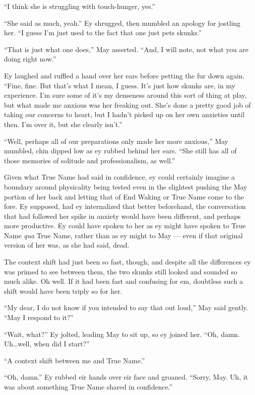 ``I think she is struggling with touch-hunger, yes.''

``She said as much, yeah.'' Ey shrugged, then mumbled an apology for jostling her. ``I guess I'm just used to the fact that one just pets skunks.''

``That is just what one does,'' May asserted. ``And, I will note, not what you are doing right now.''

Ey laughed and ruffled a hand over her ears before petting the fur down again. ``Fine, fine. But that's what I mean, I guess. It's just how skunks are, in my experience. I'm sure some of it's my denseness around this sort of thing at play, but what made me anxious was her freaking out. She's done a pretty good job of taking our concerns to heart, but I hadn't picked up on her own anxieties until then. I'm over it, but she clearly isn't.''

``Well, perhaps all of our preparations only made her more anxious,'' May mumbled, chin dipped low as ey rubbed behind her ears. ``She still has all of those memories of solitude and professionalism, as well.''

Given what True Name had said in confidence, ey could certainly imagine a boundary around physicality being tested even in the slightest pushing the May portion of her back and letting that of End Waking or True Name come to the fore. Ey supposed, had ey internalized that better beforehand, the conversation that had followed her spike in anxiety would have been different, and perhaps more productive. Ey could have spoken to her as ey might have spoken to True Name \emph{qua} True Name, rather than as ey might to May — even if that original version of her was, as she had said, dead.

The context shift had just been so fast, though, and despite all the differences ey was primed to see between them, the two skunks still looked and sounded so much alike. Oh well. If it had been fast and confusing for em, doubtless such a shift would have been triply so for her.

``My dear, I do not know if you intended to say that out loud,'' May said gently. ``May I respond to it?''

``Wait, what?'' Ey jolted, leading May to sit up, so ey joined her. ``Oh, damn. Uh\ldots well, when did I start?''

``A context shift between me and True Name.''

``Oh, damn.'' Ey rubbed eir hands over eir face and groaned. ``Sorry, May. Uh, it was about something True Name shared in confidence.''

